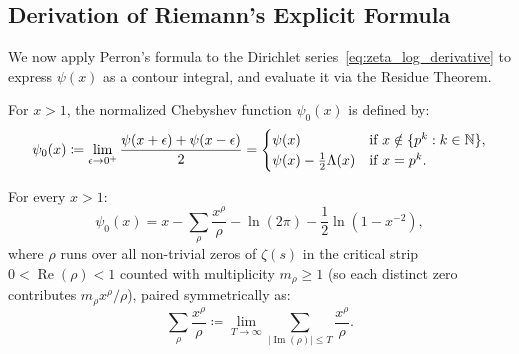 \subsection{Derivation of Riemann's Explicit Formula}

We now apply Perron's formula to the Dirichlet series~\eqref{eq:zeta_log_derivative} to express $\psi(x)$ as a contour integral, and evaluate it via the Residue Theorem.

\begin{definition}
\label{def:normalized_chebyshev}
\leanok
For $x > 1$, the normalized Chebyshev function $\psi_0(x)$ is defined by:
\begin{equation}
\psi_0(x) \coloneqq \lim_{\epsilon \to 0^+} \frac{\psi(x + \epsilon) + \psi(x - \epsilon)}{2} = \begin{cases}
\psi(x) & \text{if } x \notin \{p^k : k \in \mathbb{N}\}, \\
\psi(x) - \frac{1}{2}\Lambda(x) & \text{if } x = p^k.
\end{cases}
\end{equation}
\end{definition}

\begin{theorem}
\label{thm:riemann_explicit_formula}
\leanok
For every $x > 1$:
\begin{equation}
\label{eq:riemann_explicit_formula}
\psi_0(x) = x - \sum_{\rho} \frac{x^\rho}{\rho} - \ln(2\pi) - \frac{1}{2}\ln\left(1 - x^{-2}\right),
\end{equation}
where $\rho$ runs over all non-trivial zeros of $\zeta(s)$ in the critical strip $0 < \operatorname{Re}(\rho) < 1$ counted with multiplicity $m_\rho \ge 1$ (so each distinct zero contributes $m_\rho x^\rho/\rho$), paired symmetrically as:
\begin{equation}
\sum_{\rho} \frac{x^\rho}{\rho} \coloneqq \lim_{T \to \infty} \sum_{|\operatorname{Im}(\rho)| \le T} \frac{x^\rho}{\rho}.
\end{equation}
\end{theorem}

